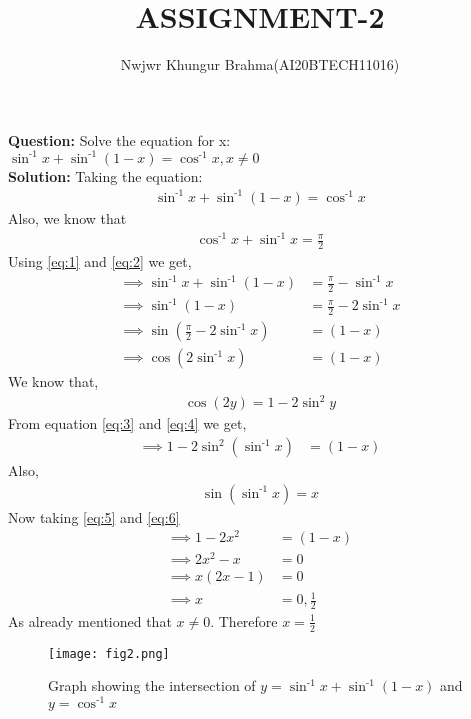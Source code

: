 \documentclass[journal,12pt,twocolumn]{IEEEtran}
\begin{document}
\vspace{3cm}
\title{ASSIGNMENT-2}
\author{Nwjwr Khungur Brahma(AI20BTECH11016)}
\maketitle
\textbf{Question:}
Solve the equation for x:\bigskip\\
$\sin^{\text{-}1}x + \sin^{\text{-}1}(1-x)= \cos^{\text{-}1}x, x \neq 0$\bigskip \\
\textbf{Solution:}
Taking the equation:
\begin{align}
\sin^{\text{-}1}x+\sin^{\text{-}1}(1-x) = \cos^{\text{-}1}x\label{eq:1}
\end{align}
Also, we know that
\begin{align}
\cos^{\text{-}1}x+\sin^{\text{-}1}x=\frac{\pi}{2}\label{eq:2}
\end{align}
Using \eqref{eq:1} and \eqref{eq:2} we get,
\begin{align}
\implies \sin^{\text{-}1}x+\sin^{\text{-}1}(1-x) &= \frac{\pi}{2} - \sin^{\text{-}1}x\\
\implies \sin^{\text{-}1}(1-x) &= \frac{\pi}{2} - 2\sin^{\text{-}1}x\\
\implies \sin\left(\frac{\pi}{2}-2\sin^{\text{-}1}x\right)&= (1-x)\\
\implies \cos(2\sin^{\text{-}1}x)&=(1-x)\label{eq:3}
\end{align}
We know that,
\begin{align}
\cos(2y)=1-2\sin^{2}y\label{eq:4}
\end{align}
From equation \eqref{eq:3} and \eqref{eq:4} we get,
\begin{align}
\implies 1-2\sin^{2}(\sin^{\text{-}1}x)&= (1-x)\label{eq:5}
\end{align}
Also,
\begin{align}
\sin(\sin^{\text{-}1}x)=x\label{eq:6}
\end{align}
Now taking \eqref{eq:5} and \eqref{eq:6}
\begin{align}
\implies 1-2x^{2}&=(1-x)\\
\implies 2x^{2}-x&=0\\
\implies x(2x-1)&=0\\
\implies x&=0,\frac{1}{2}
\end{align}
As already mentioned that $x\neq0$.
Therefore $x=\frac{1}{2}$
\begin{figure}[!ht]
\centering
\texttt{[image: fig2.png]}
\caption{Graph showing the intersection of $y = \sin^{\text{-}1}x+\sin^{\text{-}1}(1-x)$ and $y = \cos^{\text{-1}}x$}
\label{fig}
\end{figure}
\end{document}
